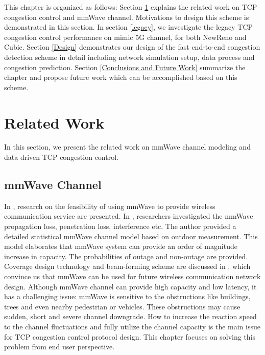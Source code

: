 \par This chapter is organized as follows: Section \ref{Related Work and Motivations} explains the related work on TCP congestion control and mmWave channel. Motivations to design this scheme is demonstrated in this section. In section \ref{legacy}, we investigate the legacy TCP congestion control performance on mimic 5G channel, for both NewReno and Cubic. Section \ref{Design} demonstrates our design of the fast end-to-end congestion detection scheme in detail including network simulation setup, data process and congestion prediction. Section \ref{Conclusions and Future Work} summarize the chapter and propose future work which can be accomplished based on this scheme.

\section{Related Work}
\label{Related Work and Motivations}
In this section, we present the related work on mmWave channel modeling and data driven TCP congestion control.  
\subsection{mmWave Channel}
\par In \cite{niu2015survey}\cite{rappaport2013millimeter}, research on the feasibility of using mmWave to provide wireless communication service are presented. In \cite{akdeniz2014millimeter}, researchers investigated the mmWave propagation loss, penetration loss, interference etc. The author provided a detailed statistical mmWave channel model based on outdoor measurement. This model elaborates that mmWave system can provide an order of magnitude increase in capacity. The probabilities of outage and non-outage are provided. Coverage design technology and beam-forming scheme are discussed in\cite{sun2014millimeter} \cite{roh2014millimeter}, which convince us that mmWave can be used for future wireless communication network design. Although mmWave channel can provide high capacity and low latency, it has a challenging issue: mmWave is sensitive to the obstructions like buildings, trees and even nearby pedestrian or vehicles. These obstructions may cause sudden, short and severe channel downgrade. How to increase the reaction speed to the channel fluctuations and fully utilize the channel capacity is the main issue for TCP congestion control protocol design. This chapter focuses on solving this problem from end user perspective.

